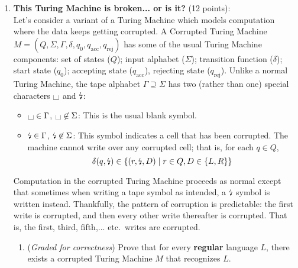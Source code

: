 \documentclass[12pt, oneside]{article}
\newcommand{\gradeCorrect}{({\it Graded for correctness}) }
\newcommand{\blank}{\scalebox{1.5}{\textvisiblespace}}
\newcommand{\corrupted}{\text{\lightning}}
\begin{document}
\begin{enumerate}
\begin{enumerate}
\end{enumerate}



\item \textbf{This Turing Machine is broken... or is it?} 
(12 points): \\
Let's consider a variant of a Turing Machine which models computation 
where the data keeps getting corrupted. A Corrupted Turing Machine $M = 
(Q, \Sigma, \Gamma, \delta, q_0, q_{\mathrm{acc}}, q_{\mathrm{rej}})$ has 
some of the usual Turing Machine components: set of states ($Q$); input 
alphabet ($\Sigma$); transition function ($\delta$); start state ($q_0$); 
accepting state ($q_{\mathrm{acc}}$), rejecting state 
($q_{\mathrm{rej}}$). Unlike a normal Turing Machine, the tape alphabet 
$\Gamma  \supseteq \Sigma$ has two (rather than one) special characters $\blank$ and $\corrupted$:
\begin{itemize}
\item $\blank \in \Gamma$, $\blank \not\in \Sigma$: This is the usual blank symbol. 
\item $\corrupted \in \Gamma$, $\corrupted \not\in \Sigma$: This symbol indicates a cell that 
has been corrupted. The machine cannot write over any corrupted cell; that is, for each $q \in Q$,
\[
\delta(q, \corrupted) \in \{ (r, \corrupted, D) \mid r \in Q, D \in \{L, R\} \}
\]
\end{itemize} 

Computation in the corrupted Turing Machine proceeds as normal except that sometimes when 
writing a tape symbol as intended, a $\corrupted$ symbol is written instead. Thankfully, 
the pattern of corruption is predictable: the first write is corrupted, and then every 
other write thereafter is corrupted. That is, the first, third, fifth,... etc.\ writes are corrupted.

\begin{enumerate}
\item\gradeCorrect Prove that for every {\bf regular} language $L$, there exists a corrupted 
Turing Machine $M$ that recognizes $L$.


\end{enumerate}
\end{enumerate}
\end{document}
